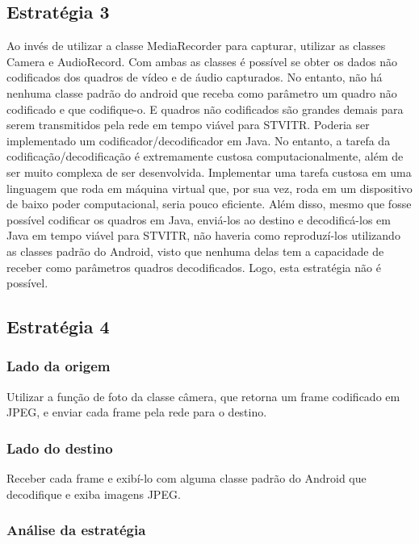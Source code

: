 \documentclass{acm_proc_article-sp}
\begin{document}
\subsection{Estratégia 3}

Ao invés de utilizar a classe MediaRecorder para capturar, utilizar as classes Camera e AudioRecord. Com ambas as classes é possível se obter os dados não codificados dos quadros de vídeo e de áudio capturados. No entanto, não há nenhuma classe padrão do android que receba como parâmetro um quadro não codificado e que codifique-o. E quadros não codificados são grandes demais para serem transmitidos pela rede em tempo viável para STVITR. Poderia ser implementado um codificador/decodificador em Java. No entanto, a tarefa da codificação/decodificação é extremamente custosa computacionalmente, além de ser muito complexa de ser desenvolvida. Implementar uma tarefa custosa em uma linguagem que roda em máquina virtual que, por sua vez, roda em um dispositivo de baixo poder computacional, seria pouco eficiente. Além disso, mesmo que fosse possível codificar os quadros em Java, enviá-los ao destino e decodificá-los em Java em tempo viável para STVITR, não haveria como reproduzí-los utilizando as classes padrão do Android, visto que nenhuma delas tem a capacidade de receber como parâmetros quadros decodificados. Logo, esta estratégia não é possível.

\subsection{Estratégia 4}

\subsubsection{Lado da origem}

Utilizar a função de foto da classe câmera, que retorna um frame codificado em JPEG, e enviar cada frame pela rede para o destino.

\subsubsection{Lado do destino}

Receber cada frame e exibí-lo com alguma classe padrão do Android que decodifique e exiba imagens JPEG.

\subsubsection{Análise da estratégia}
\end{document}

